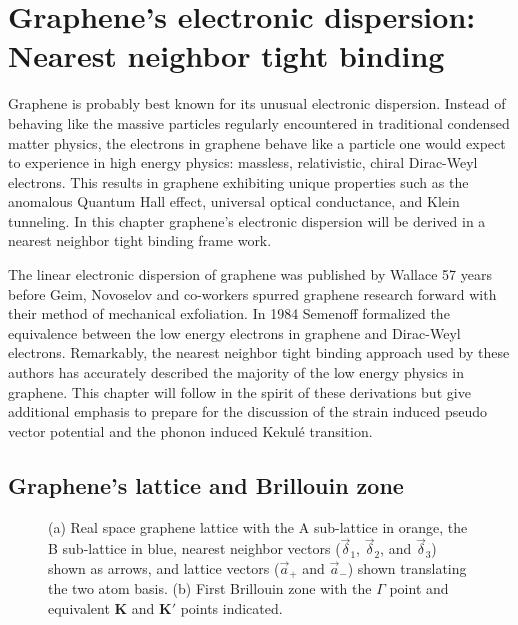 \chapter{Graphene's electronic dispersion: Nearest neighbor tight binding\label{chap:TB}}

Graphene is probably best known for its unusual electronic dispersion\cite{CastroNeto2009}.
Instead of behaving like the massive particles regularly encountered in traditional condensed matter physics, the electrons in graphene behave like a particle one would expect to experience in high energy physics: massless, relativistic, chiral Dirac-Weyl electrons\cite{Wallace1947,Semenoff1984}.
This results in graphene exhibiting unique properties such as the anomalous Quantum Hall effect\cite{Zhang2005,Novoselov2005a}, universal optical conductance\cite{Nair2008,Mak2008}, and Klein tunneling\cite{Beenakker2008,Young2009}.
In this chapter graphene's electronic dispersion will be derived in a nearest neighbor tight binding frame work.

The linear electronic dispersion of graphene was published by Wallace\cite{Wallace1947} 57 years before Geim, Novoselov and co-workers spurred graphene research forward with their method of mechanical exfoliation\cite{Novoselov2004}.
In 1984 Semenoff formalized the equivalence between the low energy electrons in graphene and Dirac-Weyl electrons.
Remarkably, the nearest neighbor tight binding approach used by these authors has accurately described the majority of the low energy physics in graphene.
This chapter will follow in the spirit of these derivations but give additional emphasis to prepare for the discussion of the strain induced pseudo vector potential and the phonon induced Kekul\'e transition.

\section{Graphene's lattice and Brillouin zone}
\begin{figure}
	\begin{center}
	
	\end{center}
	\caption{\label{fig:TB:geometry} (a) Real space graphene lattice with the A sub-lattice in orange, the B sub-lattice in blue, nearest neighbor vectors ($\vec \delta_1$, $\vec \delta_2$, and $\vec \delta_3$) shown as arrows, and lattice vectors ($\vec a_+$ and $\vec a_-$) shown translating the two atom basis. (b) First Brillouin zone with the $\Gamma$ point and equivalent $\bm{K}$ and $\bm{K'}$ points indicated.}
\end{figure}

